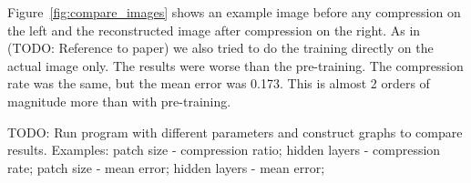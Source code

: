 \newline
Figure~\ref{fig:compare_images} shows an example image before any compression on the left and the reconstructed image after compression on the right. 
\newline
As in (TODO: Reference to paper) we also tried to do the training directly on the actual image only. The results were worse than the pre-training. The compression rate was the same, but the mean error was 0.173. This is almost 2 orders of magnitude more than with pre-training.



\newline
TODO: Run program with different parameters and construct graphs to compare results.
\newline
Examples: patch size - compression ratio; hidden layers - compression rate; patch size - mean error; hidden layers - mean error; 







